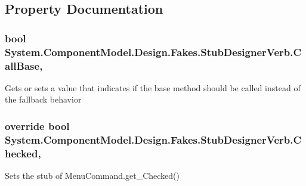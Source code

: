 \subsection{Property Documentation}
\hypertarget{class_system_1_1_component_model_1_1_design_1_1_fakes_1_1_stub_designer_verb_a5707412dcb008b25081a6b4b2035777d}{
\subsubsection[{Call\-Base}]{\setlength{\rightskip}{0pt plus 5cm}bool System.\-Component\-Model.\-Design.\-Fakes.\-Stub\-Designer\-Verb.\-Call\-Base\hspace{0.3cm}{\ttfamily [get]}, {\ttfamily [set]}}}\label{class_system_1_1_component_model_1_1_design_1_1_fakes_1_1_stub_designer_verb_a5707412dcb008b25081a6b4b2035777d}


Gets or sets a value that indicates if the base method should be called instead of the fallback behavior

\hypertarget{class_system_1_1_component_model_1_1_design_1_1_fakes_1_1_stub_designer_verb_a8271d8370e0ba402d1a15da40b466018}{
\subsubsection[{Checked}]{\setlength{\rightskip}{0pt plus 5cm}override bool System.\-Component\-Model.\-Design.\-Fakes.\-Stub\-Designer\-Verb.\-Checked\hspace{0.3cm}{\ttfamily [get]}, {\ttfamily [set]}}}\label{class_system_1_1_component_model_1_1_design_1_1_fakes_1_1_stub_designer_verb_a8271d8370e0ba402d1a15da40b466018}


Sets the stub of Menu\-Command.\-get\-\_\-\-Checked()

